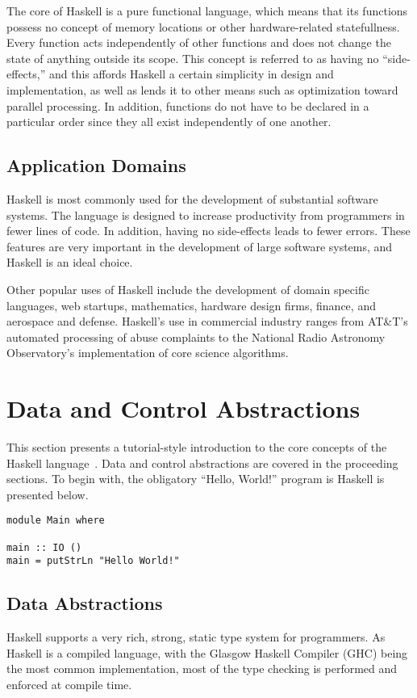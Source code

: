 \documentclass[titlepage,12pt]{article}
\begin{document}
The core of Haskell is a pure functional language, which means that its functions possess no concept of memory locations or other
hardware-related statefullness. Every function acts independently of other functions and does not change the state of anything outside 
its scope. This concept is referred to as having no ``side-effects,'' and this affords Haskell a certain simplicity in design
and implementation, as well as lends it to other means such as optimization toward parallel processing. In addition,
functions do not have to be declared in a particular order since they all exist independently of one another. 

\subsection{Application Domains}

Haskell is most commonly used for the development of substantial software systems. The language is designed to increase
productivity from programmers in fewer lines of code. In addition, having no side-effects leads to fewer errors.
These features are very important in the development of large software systems, and Haskell is an ideal choice. 

Other popular uses of Haskell include the development of domain specific languages, web startups, mathematics, 
hardware design firms, finance, and aerospace and defense. Haskell's use in commercial industry ranges from AT\&T's 
automated processing of abuse complaints to the National Radio Astronomy Observatory’s implementation of core science algorithms.


\section{Data and Control Abstractions}
This section presents a tutorial-style introduction to the core concepts of
the Haskell language~\cite{learnyouahaskell}.  Data and control abstractions are covered
in the proceeding sections.  To begin with, the obligatory ``Hello, World!'' program is Haskell
is presented below.

\begin{verbatim}
module Main where

main :: IO ()
main = putStrLn "Hello World!"
\end{verbatim}

\subsection{Data Abstractions}
Haskell supports a very rich, strong, static type system for programmers.  As Haskell is
a compiled language, with the Glasgow Haskell Compiler (GHC) being the most common implementation,
most of the type checking is performed and enforced at compile time.
\end{document}
